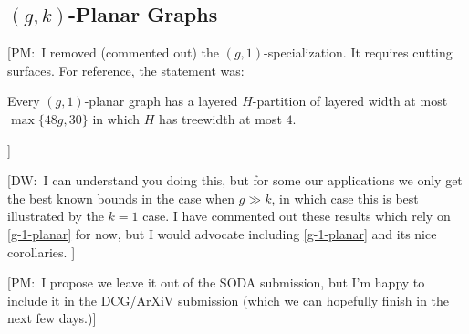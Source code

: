 \documentclass{patmorin}
\newcommand{\note}[2]{{\color{red}[#1:~#2]}}
\begin{document}
\subsection{\boldmath  $(g,k)$-Planar Graphs}
\label{sec-g-k-planar}


\note{PM}{I removed (commented out) the $(g,1)$-specialization. It requires cutting surfaces.  For reference, the statement was:
\begin{thm}
\label{g-1-planar}
Every $(g,1)$-planar graph has a layered $H$-partition of layered width at most $\max\{48g, 30\}$ in which $H$ has treewidth at most $4$.  
\end{thm}
}

\note{DW}{I can understand you doing this, but for some our applications we only get the best known bounds in the case when $g\gg k$, in which case this is best illustrated by the $k=1$ case. I have commented out these results which rely on  \cref{g-1-planar} for now, but I would advocate including  \cref{g-1-planar} and its nice corollaries. }

\note{PM}{I propose we leave it out of the SODA submission, but I'm happy to include it in the DCG/ArXiV submission (which we can hopefully finish in the next few days.)}
\end{document}
